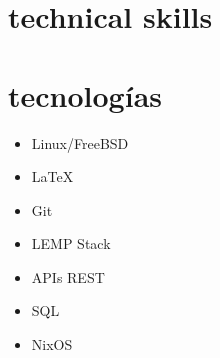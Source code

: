 \documentclass[letterpaper,11pt]{article}
\begin{document}
{\begin{minipage}[t]{0.31\textwidth}
        {\section{technical skills}}
        {\section{tecnologías}}%
    \hlight
    \begin{itemize}[]
            \item{Linux/FreeBSD}
            \item{\LaTeX}
            \item{Git}
            \item{LEMP Stack}
            \item{APIs REST}
            \item{SQL}
            \item{NixOS}
          \end{itemize}


\end{minipage}}
\end{document}
